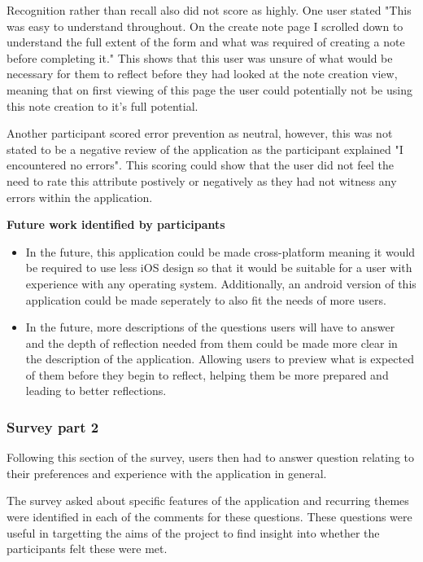 \documentclass{l4proj}
\begin{document}
Recognition rather than recall also did not score as highly. One user stated "This was easy to understand throughout. On the create note page I scrolled down to understand the full extent of the form and what was required of creating a note before completing it." This shows that this user was unsure of what would be necessary for them to reflect before they had looked at the note creation view, meaning that on first viewing of this page the user could potentially not be using this note creation to it's full potential. 

Another participant scored error prevention as neutral, however, this was not stated to be a negative review of the application as the participant explained "I encountered no errors". This scoring could show that the user did not feel the need to rate this attribute postively or negatively as they had not witness any errors within the application. 
 
\textbf{Future work identified by participants}
\begin{itemize}
    \item In the future, this application could be made cross-platform meaning it would be required to use less iOS design so that it would be suitable for a user with experience with any operating system. Additionally, an android version of this application could be made seperately to also fit the needs of more users. 
    \item In the future, more descriptions of the questions users will have to answer and the depth of reflection needed from them could be made more clear in the description of the application. Allowing users to preview what is expected of them before they begin to reflect, helping them be more prepared and leading to better reflections.
\end{itemize}

\subsubsection{Survey part 2}
 
Following this section of the survey, users then had to answer question relating to their preferences and experience with the application in general. 

The survey asked about specific features of the application and recurring themes were identified in each of the comments for these questions. These questions were useful in targetting the aims of the project to find insight into whether the participants felt these were met.
 
\end{document}
